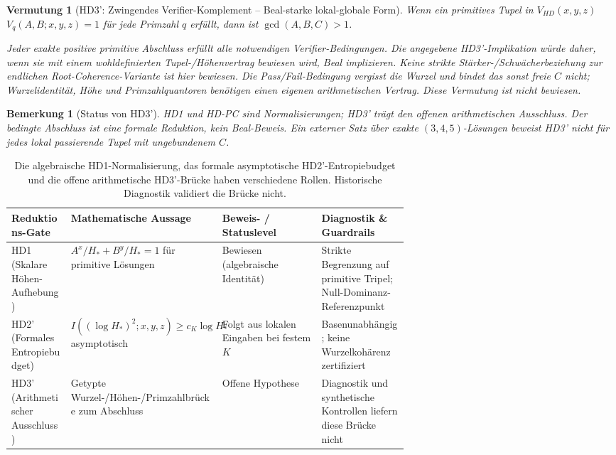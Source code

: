 \documentclass[11pt,a4paper]{article}
\newtheorem{conjecture}[theorem]{Vermutung}
\newtheorem{remark}[theorem]{Bemerkung}
\begin{document}
\begin{conjecture}[HD3': Zwingendes Verifier-Komplement -- Beal-starke
lokal-globale Form]
\label{conj:hd3prime}
Wenn ein primitives Tupel in $V_{HD}(x,y,z)$ $V_q(A,B;x,y,z)=1$ für
jede Primzahl $q$ erfüllt, dann ist $\gcd(A,B,C)>1$.

Jeder exakte positive primitive Abschluss erfüllt alle notwendigen
Verifier-Bedingungen. Die angegebene HD3'-Implikation würde daher, wenn
sie mit einem wohldefinierten Tupel-/Höhenvertrag bewiesen wird, Beal
implizieren. Keine strikte Stärker-/Schwächerbeziehung zur endlichen
Root-Coherence-Variante ist hier bewiesen.
Die Pass/Fail-Bedingung vergisst die Wurzel und bindet das sonst freie $C$
nicht; Wurzelidentität, Höhe und Primzahlquantoren benötigen einen eigenen
arithmetischen Vertrag. Diese Vermutung ist nicht bewiesen.
\end{conjecture}
\begin{remark}[Status von HD3']
HD1 und HD-PC sind Normalisierungen; HD3' trägt den offenen arithmetischen
Ausschluss. Der bedingte Abschluss ist eine formale Reduktion, kein Beal-Beweis.
Ein externer Satz über exakte $(3,4,5)$-Lösungen beweist HD3' nicht für
jedes lokal passierende Tupel mit ungebundenem $C$.
\end{remark}

\begin{table}[htb]
\centering
\small
\begin{tabularx}{\textwidth}{@{} >{\raggedright\arraybackslash}p{0.15\linewidth} >{\raggedright\arraybackslash}p{0.25\linewidth} >{\raggedright\arraybackslash}p{0.25\linewidth} >{\raggedright\arraybackslash}X @{}}
\toprule
Reduktions-Gate & Mathematische Aussage & Beweis- / Statuslevel & Diagnostik \& Guardrails \\
\midrule
HD1 (Skalare Höhen-Aufhebung) & $A^x/H_* + B^y/H_* = 1$ für primitive Lösungen & Bewiesen (algebraische Identität) & Strikte Begrenzung auf primitive Tripel; Null-Dominanz-Referenzpunkt \\
\addlinespace
HD2' (Formales Entropiebudget) & $I((\log H_*)^2;x,y,z)\ge c_K\log H_*$ asymptotisch & Folgt aus lokalen Eingaben bei festem $K$ & Basenunabhängig; keine Wurzelkohärenz zertifiziert \\
\addlinespace
HD3' (Arithmetischer Ausschluss) & Getypte Wurzel-/Höhen-/Primzahlbrücke zum Abschluss & Offene Hypothese & Diagnostik und synthetische Kontrollen liefern diese Brücke nicht \\
\bottomrule
\end{tabularx}
\caption{Die algebraische HD1-Normalisierung, das formale asymptotische HD2'-Entropiebudget und die offene arithmetische HD3'-Brücke haben verschiedene Rollen. Historische Diagnostik validiert die Brücke nicht.}
\label{tab:reduction_matrix}
\end{table}
\end{document}
